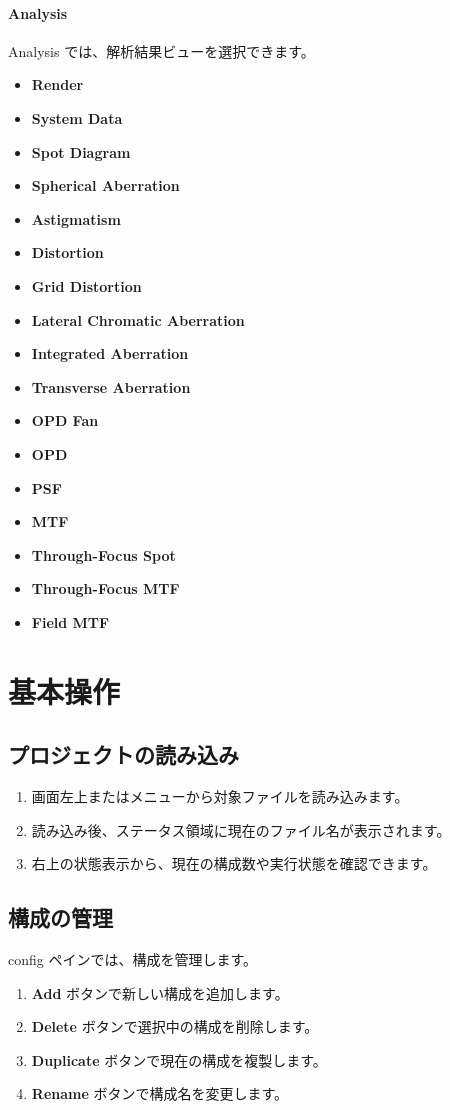 \documentclass[11pt]{article}
\begin{document}
\paragraph{Analysis}
Analysis では、解析結果ビューを選択できます。
\begin{itemize}
  \item \textbf{Render}
  \item \textbf{System Data}
  \item \textbf{Spot Diagram}
  \item \textbf{Spherical Aberration}
  \item \textbf{Astigmatism}
  \item \textbf{Distortion}
  \item \textbf{Grid Distortion}
  \item \textbf{Lateral Chromatic Aberration}
  \item \textbf{Integrated Aberration}
  \item \textbf{Transverse Aberration}
  \item \textbf{OPD Fan}
  \item \textbf{OPD}
  \item \textbf{PSF}
  \item \textbf{MTF}
  \item \textbf{Through-Focus Spot}
  \item \textbf{Through-Focus MTF}
  \item \textbf{Field MTF}
\end{itemize}

\section{基本操作}
\subsection{プロジェクトの読み込み}
\begin{enumerate}
  \item 画面左上またはメニューから対象ファイルを読み込みます。
  \item 読み込み後、ステータス領域に現在のファイル名が表示されます。
  \item 右上の状態表示から、現在の構成数や実行状態を確認できます。
\end{enumerate}

\subsection{構成の管理}
config ペインでは、構成を管理します。
\begin{enumerate}
  \item \textbf{Add} ボタンで新しい構成を追加します。
  \item \textbf{Delete} ボタンで選択中の構成を削除します。
  \item \textbf{Duplicate} ボタンで現在の構成を複製します。
  \item \textbf{Rename} ボタンで構成名を変更します。
\end{enumerate}
\end{document}
